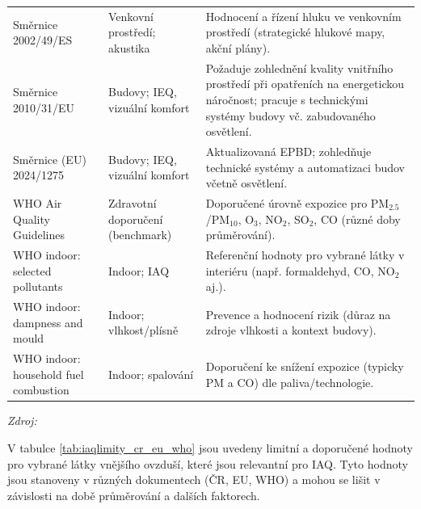 \begin{table}[p]
\begin{center}
\begin{tabularx}{\textwidth}{@{}
>{\raggedright\arraybackslash}p{}
  >{\raggedright\arraybackslash}p{}
  X@{}}
Směrnice 2002/49/ES &
Venkovní prostředí; akustika &
Hodnocení a řízení hluku ve venkovním prostředí (strategické hlukové mapy, akční plány). \\

Směrnice 2010/31/EU &
Budovy; IEQ, vizuální komfort &
Požaduje zohlednění kvality vnitřního prostředí při opatřeních na energetickou náročnost; pracuje s technickými systémy budovy vč. zabudovaného osvětlení. \\

Směrnice (EU) 2024/1275 &
Budovy; IEQ, vizuální komfort &
Aktualizovaná EPBD; zohledňuje technické systémy a automatizaci budov včetně osvětlení. \\

\midrule
WHO Air Quality Guidelines &
Zdravotní doporučení (benchmark) &
Doporučené úrovně expozice pro PM$_{2.5}$/PM$_{10}$, O$_3$, NO$_2$, SO$_2$, CO (různé doby průměrování). \\

WHO indoor: selected pollutants &
Indoor; IAQ &
Referenční hodnoty pro vybrané látky v interiéru (např. formaldehyd, CO, NO$_2$ aj.). \\

WHO indoor: dampness and mould &
Indoor; vlhkost/plísně &
Prevence a hodnocení rizik (důraz na zdroje vlhkosti a kontext budovy). \\

WHO indoor: household fuel combustion &
Indoor; spalování &
Doporučení ke snížení expozice (typicky PM a CO) dle paliva/technologie. \\

\bottomrule
\end{tabularx}
\end{center}

\footnotesize \textit{Zdroj:} \parencite{wolterskluwerZakon2582000,info@wolterskluwer.czVyhlaska432025,info@wolterskluwer.czZakon2832021,wolterskluwerNarizeni36120072007,info@wolterskluwer.czNarizeni2722011,MetodickyNavodZD252013,wolterskluwerZakon20120122012,SmerniceEvropskehoParlamentu2008,SmerniceEvropskehoParlamentu2002,SmerniceEvropskehoParlamentu2010,SmerniceEvropskehoParlamentu2024a,worldhealthorganizationWHOGlobalAir2021,adamkiewiczWHOGuidelinesIndoor2010,heseltine2009guidelines,world2014guidelines}
\end{table}

V tabulce \ref{tab:iaqlimity_cr_eu_who} jsou uvedeny limitní a doporučené hodnoty pro vybrané látky vnějšího ovzduší, které jsou relevantní pro IAQ. Tyto hodnoty jsou stanoveny v různých dokumentech (ČR, EU, WHO) a mohou se lišit v závislosti na době průměrování a dalších faktorech. 

